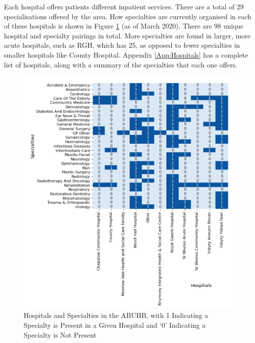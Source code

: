 \documentclass[../thesis.tex]{subfiles}
\begin{document}
Each hospital offers patients different inpatient services. There are a total of 29 specialisations offered by the area. How specialties are currently organised in each of these hospitals is shown in Figure \ref{fig:hospspec} (as of March 2020). There are 98 unique hospital and specialty pairings in total. More specialties are found in larger, more acute hospitals, such as RGH, which has 25, as opposed to fewer specialties in smaller hospitals like County Hospital. Appendix \ref{App:Hospitals} has a complete list of hospitals, along with a summary of the specialties that each one offers.

\begin{figure}[h!]
    \centering
    \includegraphics{Chapters/Chapter1/Figures/Combination Hospitals and Specialties.png}
    \caption{Hospitals and Specialties in the ABUHB, with 1 Indicating a Specialty is Present in a Given Hospital and `0' Indicating a Specialty is Not Present}
    \label{fig:hospspec}
\end{figure}


\end{document}

